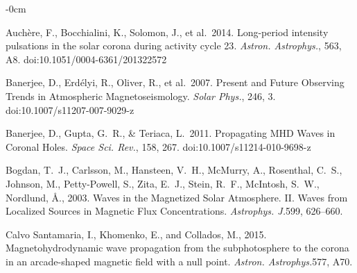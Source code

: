 \documentclass[physics,article,submit,pdftex,moreauthors]{Definitions/mdpi}
\newcommand{\aap}{{\it Astron. Astrophys.}}
\newcommand{\apj}{{\it Astrophys. J.}}
\newcommand{\solphys}{{\it Solar Phys.}}
\newcommand{\ssr}{{\it Space Sci. Rev.}}
\begin{document}
\begin{adjustwidth}{-\extralength}{0cm}



%

\begin{thebibliography}{999}
 Auch{\`e}re, F., Bocchialini, K., Solomon, J., et al.\ 2014. {Long-period intensity pulsations in the solar corona during activity cycle 23}. \aap, 563, A8. doi:10.1051/0004-6361/201322572

 Banerjee, D., Erd{\'e}lyi, R., Oliver, R., et al.\ 2007. {Present and Future Observing Trends in Atmospheric Magnetoseismology}. \solphys, 246, 3. doi:10.1007/s11207-007-9029-z

 Banerjee, D., Gupta, G.~R., \& Teriaca, L.\ 2011. {Propagating MHD Waves in Coronal Holes}. \ssr, 158, 267. doi:10.1007/s11214-010-9698-z

{Bogdan}, T.~J., {Carlsson}, M., {Hansteen}, V.~H., {McMurry}, A., {Rosenthal},
  C.~S., {Johnson}, M., {Petty-Powell}, S., {Zita}, E.~J., {Stein}, R.~F.,
  {McIntosh}, S.~W., {Nordlund}, {\AA}., 2003. {Waves in the Magnetized Solar
  Atmosphere. II. Waves from Localized Sources in Magnetic Flux
  Concentrations}. \apj 599, 626--660.

 {Calvo Santamaria}, I., {Khomenko}, E.,  and {Collados}, M., 2015. {Magnetohydrodynamic wave propagation from the subphotosphere to the corona in an arcade-shaped magnetic field with a null point}. \aap 577, A70.


\end{thebibliography}
\end{adjustwidth}
\end{document}
